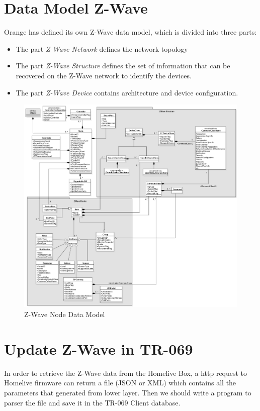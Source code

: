 \section{Data Model Z-Wave}
Orange has defined its own Z-Wave data model, which is divided into three parts:
\begin{itemize}
  \item The part \textit{Z-Wave Network} defines the network topology
  \item The part \textit{Z-Wave Structure} defines the set of information that can be recovered on the Z-Wave network to identify the devices.
  \item The part \textit{Z-Wave Device} contains architecture and device configuration.
\end{itemize}

\begin{figure}[htbp]
	\centering
		\includegraphics[width=14.5cm]{Figures/datamodel.png}
	\caption[Z-Wave Node Data Model]{Z-Wave Node Data Model}
	\label{fig:zwavedatamodel}
\end{figure}
\section{Update Z-Wave in TR-069}
In order to retrieve the Z-Wave data from the Homelive Box, a http request to Homelive firmware can return a file (JSON or XML) which contains all the parameters that generated from lower layer. Then we should write a program to parser the file and save it in the TR-069 Client database.

